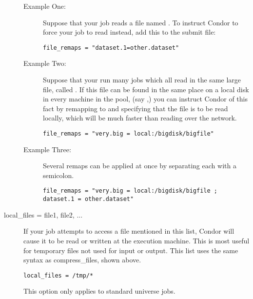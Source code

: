 \begin{description}
\begin{description}
\item[Example One:]
Suppose that your job reads a file named .
To instruct Condor
to force your job to read  instead,
add this to the submit file:
\begin{verbatim}
file_remaps = "dataset.1=other.dataset"
\end{verbatim}
\item[Example Two:]
Suppose that your run many jobs which all read in the same large file,
called .
If this file can be found in the same place on
a local disk in every machine in the pool,
(say ,) you can
instruct Condor of this fact by remapping  to
 and specifying that the file is to be read locally,
which will be much faster than reading over the network.
\begin{verbatim}
file_remaps = "very.big = local:/bigdisk/bigfile"
\end{verbatim}
\item[Example Three:]
Several remaps can be applied at once by separating each with a semicolon.
\footnotesize
\begin{verbatim}
file_remaps = "very.big = local:/bigdisk/bigfile ; dataset.1 = other.dataset"
\end{verbatim}
\normalsize
\end{description}



\item[local\_files = file1, file2, ...]

If your job attempts to access a file mentioned in this list,
Condor will cause it to be read or written at the execution machine.
This is most useful for temporary files not used for input or output.
This list uses the same syntax as compress\_files, shown above.

\begin{verbatim}
local_files = /tmp/*
\end{verbatim}

This option only applies to standard universe jobs.



\end{description}
